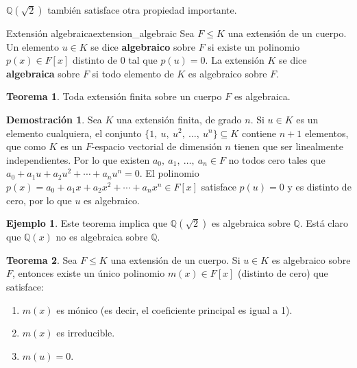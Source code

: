 \documentclass[a4paper]{book}
\theoremstyle{definition}
\newtheorem{theorem}{Teorema}[section]
\theoremstyle{ejemplo}
\newtheorem{ejem}{Ejemplo}[section]
\theoremstyle{demostracion}
\newtheorem{dem}{Demostración}
\newcommand{\racionales}{\mathbb{Q}}
\begin{document}
$\racionales(\sqrt{2})$ también satisface otra propiedad importante.

\begin{define}{Extensión algebraica}{extension_algebraic}
	Sea $F \leq K$ una extensión de un cuerpo. Un elemento $u \in K$ se dice \textbf{algebraico} sobre $F$ si existe un polinomio $p(x) \in F[x]$ distinto de $0$ tal que $p(u) = 0$. La extensión $K$ se dice \textbf{algebraica} sobre $F$ si todo elemento de $K$ es algebraico sobre $F$.
\end{define}

\begin{theorem}
	Toda extensión finita sobre un cuerpo $F$ es algebraica.
\end{theorem}

\begin{dem}
	Sea $K$ una extensión finita, de grado $n$. Si $u \in K$ es un elemento cualquiera, el conjunto $\{1,\ u,\ u^2,\ \ldots,\ u^n\} \subseteq K$ contiene $n + 1$ elementos, que como $K$ es un $F$-espacio vectorial de dimensión $n$ tienen que ser linealmente independientes. Por lo que existen $a_0,\ a_1,\ \ldots,\ a_n \in F$ no todos cero tales que $a_0 + a_1 u + a_2 u^2 + \cdots + a_n u^n = 0$. El polinomio $p(x) = a_0 + a_1 x + a_2 x^2 + \cdots + a_n x^n \in F[x]$ satisface $p(u) = 0$ y es distinto de cero, por lo que $u$ es algebraico.
\end{dem}

\begin{ejem}
	Este teorema implica que $\racionales(\sqrt{2})$ es algebraica sobre $\racionales$. Está claro que $\racionales(x)$ no es algebraica sobre $\racionales$.
\end{ejem}

\begin{theorem}
	Sea $F \leq K$ una extensión de un cuerpo. Si $u \in K$ es algebraico sobre $F$, entonces existe un único polinomio $m(x) \in F[x]$ (distinto de cero) que satisface:
	\begin{enumerate}
		\item
		$m(x)$ es mónico (es decir, el coeficiente principal es igual a 1).
		\item
		$m(x)$ es irreducible.
		\item		
		$m(u) = 0$.
	\end{enumerate}
\end{theorem}
\end{document}
